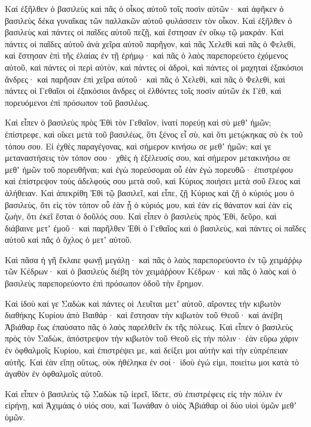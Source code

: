 {\par }{\PP {}Καὶ ἐξῆλθεν ὁ βασιλεὺς καὶ πᾶς ὁ οἶκος αὐτοῦ τοῖς ποσὶν αὐτῶν· καὶ ἀφῆκεν ὁ βασιλεὺς δέκα γυναῖκας τῶν παλλακῶν αὐτοῦ φυλάσσειν τὸν οἶκον.
Καὶ ἐξῆλθεν ὁ βασιλεὺς καὶ πάντες οἱ παῖδες αὐτοῦ πεζῇ, καὶ ἔστησαν ἐν οἴκῳ τῷ μακράν.
Καὶ πάντες οἱ παῖδες αὐτοῦ ἀνὰ χεῖρα αὐτοῦ παρῆγον, καὶ πᾶς Χελεθὶ καὶ πᾶς ὁ Φελεθὶ, καὶ ἔστησαν ἐπὶ τῆς ἐλαίας ἐν τῇ ἐρήμῳ· καὶ πᾶς ὁ λαὸς παρεπορεύετο ἐχόμενος αὐτοῦ, καὶ πάντες οἱ περὶ αὐτὸν, καὶ πάντες οἱ ἁδροὶ, καὶ πάντες οἱ μαχηταὶ ἑξακόσιοι ἄνδρες· καὶ παρῆσαν ἐπὶ χεῖρα αὐτοῦ· καὶ πᾶς ὁ Χελεθὶ, καὶ πᾶς ὁ Φελεθὶ, καὶ πάντες οἱ Γεθαῖοι οἱ ἑξακόσιοι ἄνδρες οἱ ἐλθόντες τοῖς ποσὶν αὐτῶν ἐκ Γὲθ, καὶ πορευόμενοι ἐπὶ πρόσωπον τοῦ βασιλέως.
\par }{\PP {}Καὶ εἶπεν ὁ βασιλεὺς πρὸς Ἐθὶ τὸν Γεθαῖον, ἱνατί πορεύῃ καὶ σὺ μεθʼ ἡμῶν; ἐπίστρεφε, καὶ οἴκει μετὰ τοῦ βασιλέως, ὅτι ξένος εἶ σὺ, καὶ ὅτι μετῴκηκας σὺ ἐκ τοῦ τόπου σου.
Εἰ ἐχθὲς παραγέγονας, καὶ σήμερον κινήσω σε μεθʼ ἡμῶν; καί γε μεταναστήσεις τὸν τόπον σου· χθὲς ἡ ἐξέλευσίς σου, καὶ σήμερον μετακινήσω σε μεθʼ ἡμῶν τοῦ πορευθῆναι; καὶ ἐγὼ πορεύσομαι οὗ ἐὰν ἐγὼ πορευθῶ· ἐπιστρέφου καὶ ἐπίστρεψον τοὺς ἀδελφούς σου μετὰ σοῦ, καὶ Κύριος ποιήσει μετὰ σοῦ ἔλεος καὶ ἀλήθειαν.
Καὶ ἀπεκρίθη Ἐθὶ τῷ βασιλεῖ, καὶ εἶπε, ζῇ Κύριος καὶ ζῇ ὁ κύριός μου ὁ βασιλεὺς, ὅτι εἰς τὸν τόπον οὗ ἐὰν ᾖ ὁ κύριός μου, καὶ ἐὰν εἰς θάνατον καὶ ἐὰν εἰς ζωὴν, ὅτι ἐκεῖ ἔσται ὁ δοῦλός σου.
Καὶ εἶπεν ὁ βασιλεὺς πρὸς Ἐθὶ, δεῦρο, καὶ διάβαινε μετʼ ἐμοῦ· καὶ παρῆλθεν Ἐθὶ ὁ Γεθαῖος καὶ ὁ βασιλεὺς, καὶ πάντες οἱ παῖδες αὐτοῦ καὶ πᾶς ὁ ὄχλος ὁ μετʼ αὐτοῦ.
\par }{\PP {}Καὶ πᾶσα ἡ γῆ ἔκλαιε φωνῇ μεγάλῃ· καὶ πᾶς ὁ λαὸς παρεπορεύοντο ἐν τῷ χειμάῤῥῳ τῶν Κέδρων· καὶ ὁ βασιλεὺς διέβη τὸν χειμάῤῥουν Κέδρων· καὶ πᾶς ὁ λαὸς καὶ ὁ βασιλεὺς παρεπορεύοντο ἐπὶ πρόσωπον ὁδοῦ τὴν ἔρημον.
\par }{\PP {}Καὶ ἰδοὺ καί γε Σαδὼκ καὶ πάντες οἱ Λευῖται μετʼ αὐτοῦ, αἴροντες τὴν κιβωτὸν διαθήκης Κυρίου ἀπὸ Βαιθάρ· καὶ ἔστησαν τὴν κιβωτὸν τοῦ Θεοῦ· καὶ ἀνέβη Ἀβιάθαρ ἕως ἐπαύσατο πᾶς ὁ λαὸς παρελθεῖν ἐκ τῆς πόλεως.
Καὶ εἶπεν ὁ βασιλεὺς πρὸς τὸν Σαδὼκ, ἀπόστρεψον τὴν κιβωτὸν τοῦ Θεοῦ εἰς τὴν πόλιν· ἐὰν εὕρω χάριν ἐν ὀφθαλμοῖς Κυρίου, καὶ ἐπιστρέψει με, καὶ δείξει μοι αὐτὴν καὶ τὴν εὐπρέπειαν αὐτῆς.
Καὶ ἐὰν εἴπῃ οὕτως, οὐκ ἠθέληκα ἐν σοί· ἰδοὺ ἐγώ εἰμι, ποιείτω μοι κατὰ τὸ ἀγαθὸν ἐν ὀφθαλμοῖς αὐτοῦ.
\par }{\PP {}Καὶ εἶπεν ὁ βασιλεὺς τῷ Σαδὼκ τῷ ἱερεῖ, ἴδετε, σὺ ἐπιστρέφεις εἰς τὴν πόλιν ἐν εἰρήνῃ, καὶ Ἀχιμάας ὁ υἱός σου, καὶ Ἰωνάθαν ὁ υἱὸς Ἀβιάθαρ οἱ δύο υἱοὶ ὑμῶν μεθʼ ὑμῶν.
}
